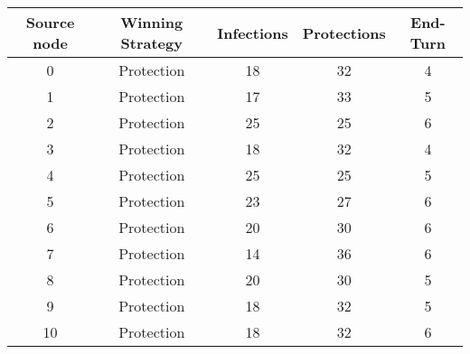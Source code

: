 \documentclass[results.tex]{subfiles}
\begin{document}
    \begin{center}
        \begin{tabular}{| c || c | c | c | c |}
            \hline
            {\bfseries Source node} & {\bfseries Winning Strategy} & {\bfseries Infections} & {\bfseries Protections}
            & {\bfseries End-Turn}
            \\  %
            \hline\hline
            0                       & Protection                   & 18                     & 32                      & 4                    \\
            \hline
            1                       & Protection                   & 17                     & 33                      & 5                    \\
            \hline
            2                       & Protection                   & 25                     & 25                      & 6                    \\
            \hline
            3                       & Protection                   & 18                     & 32                      & 4                    \\
            \hline
            4                       & Protection                   & 25                     & 25                      & 5                    \\
            \hline
            5                       & Protection                   & 23                     & 27                      & 6                    \\
            \hline
            6                       & Protection                   & 20                     & 30                      & 6                    \\
            \hline
            7                       & Protection                   & 14                     & 36                      & 6                    \\
            \hline
            8                       & Protection                   & 20                     & 30                      & 5                    \\
            \hline
            9                       & Protection                   & 18                     & 32                      & 5                    \\
            \hline
            10                      & Protection                   & 18                     & 32                      & 6                    \\

\end{tabular}
\end{center}
\end{document}
